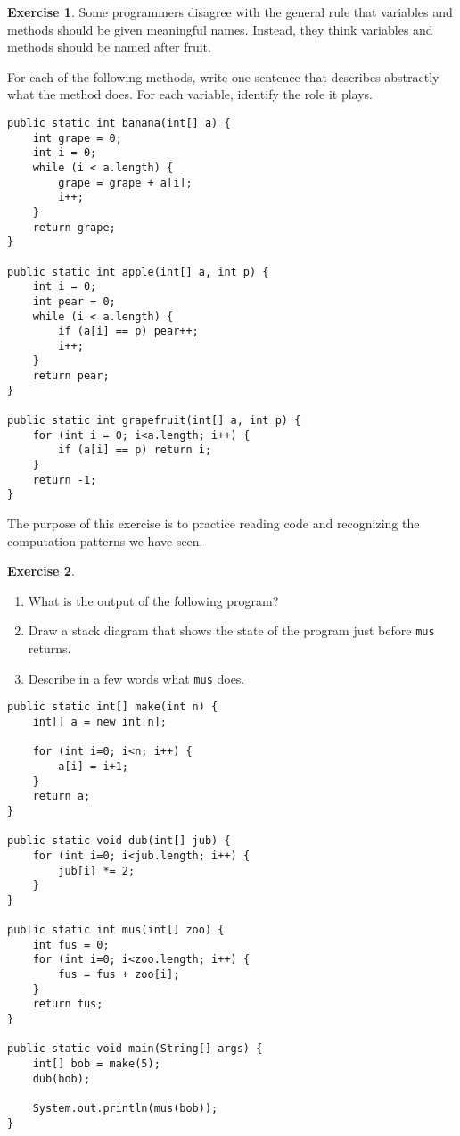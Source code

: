 \documentclass[12pt]{book}
\theoremstyle{definition}
\newtheorem{excz}{Exercise}[chapter]
\newenvironment{exercise}{\bigskip\begin{excz}\mbox{}}{\end{excz}}
\begin{document}
\begin{exercise}
Some programmers disagree with the general rule that variables
and methods should be given meaningful names.  Instead, they
think variables and methods should be named after fruit.

For each of the following methods, write one sentence that
describes abstractly what the method does.  For each variable,
identify the role it plays.

\begin{lstlisting}
public static int banana(int[] a) {
    int grape = 0;
    int i = 0;
    while (i < a.length) {
        grape = grape + a[i];
        i++;
    }
    return grape;
}
	
public static int apple(int[] a, int p) {
    int i = 0;
    int pear = 0;
    while (i < a.length) {
        if (a[i] == p) pear++;
        i++;
    }
    return pear;
}

public static int grapefruit(int[] a, int p) {
    for (int i = 0; i<a.length; i++) {
        if (a[i] == p) return i;
    }
    return -1;
}		
\end{lstlisting}

The purpose of this exercise is to practice reading code and
recognizing the computation patterns we have seen.
\end{exercise}


\begin{exercise}
\begin{enumerate}

\item What is the output of the following program?

\item Draw a stack diagram that shows the state of the
program just before {\tt mus} returns.

\item Describe in a few words what {\tt mus} does.
\end{enumerate}

\begin{lstlisting}
public static int[] make(int n) {
    int[] a = new int[n];

    for (int i=0; i<n; i++) {
        a[i] = i+1;
    }
    return a;
}

public static void dub(int[] jub) {
    for (int i=0; i<jub.length; i++) {
        jub[i] *= 2;
    }
}

public static int mus(int[] zoo) {
    int fus = 0;
    for (int i=0; i<zoo.length; i++) {
        fus = fus + zoo[i];
    }
    return fus;
}

public static void main(String[] args) {
    int[] bob = make(5);
    dub(bob);

    System.out.println(mus(bob));
}
\end{lstlisting}
\end{exercise}
\end{document}
